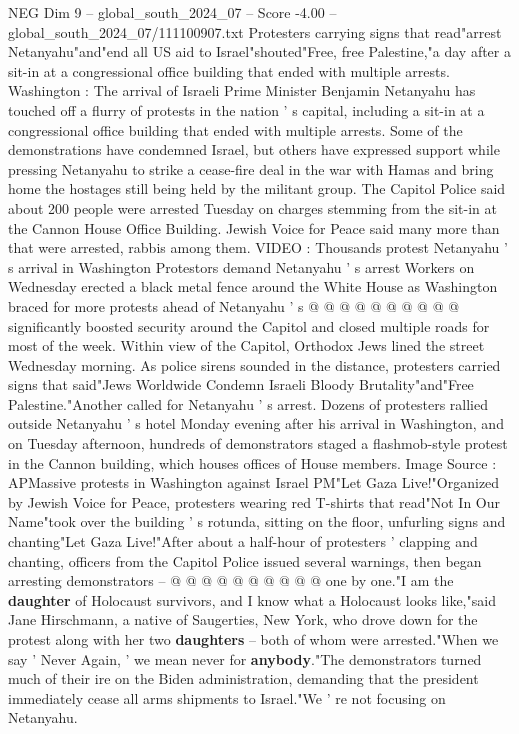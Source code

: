 \begin{textsample}{NEG Dim 9 – global\_south\_2024\_07 – Score -4.00 – global\_south\_2024\_07/111100907.txt}  \label{ex:f9_neg_340}
Protesters carrying signs that read"arrest Netanyahu"and"end all US aid to Israel"shouted"Free, free Palestine,"a day after a sit-in at a congressional office building that ended with multiple arrests.
Washington : The arrival of Israeli Prime Minister Benjamin Netanyahu has touched off a flurry of protests in the nation ' s capital, including a sit-in at a congressional office building that ended with multiple arrests.
Some of the demonstrations have condemned Israel, but others have expressed support while pressing Netanyahu to strike a cease-fire deal in the war with Hamas and bring home the hostages still being held by the militant group.
The Capitol Police said about 200 people were arrested Tuesday on charges stemming from the sit-in at the Cannon House Office Building.
Jewish Voice for Peace said many more than that were arrested, rabbis among them.
VIDEO : Thousands protest Netanyahu ' s arrival in Washington Protestors demand Netanyahu ' s arrest Workers on Wednesday erected a black metal fence around the White House as Washington braced for more protests ahead of Netanyahu ' s @ @ @ @ @ @ @ @ @ @ significantly boosted security around the Capitol and closed multiple roads for most of the week.
Within view of the Capitol, Orthodox Jews lined the street Wednesday morning.
As police sirens sounded in the distance, protesters carried signs that said"Jews Worldwide Condemn Israeli Bloody Brutality"and"Free Palestine."Another called for Netanyahu ' s arrest.
Dozens of protesters rallied outside Netanyahu ' s hotel Monday evening after his arrival in Washington, and on Tuesday afternoon, hundreds of demonstrators staged a flashmob-style protest in the Cannon building, which houses offices of House members.
Image Source : APMassive protests in Washington against Israel PM"Let Gaza Live!"Organized by Jewish Voice for Peace, protesters wearing red T-shirts that read"Not In Our Name"took over the building ' s rotunda, sitting on the floor, unfurling signs and chanting"Let Gaza Live!"After about a half-hour of protesters ' clapping and chanting, officers from the Capitol Police issued several warnings, then began arresting demonstrators -- @ @ @ @ @ @ @ @ @ @ one by one."I am the \textbf{daughter} of Holocaust survivors, and I know what a Holocaust looks like,"said Jane Hirschmann, a native of Saugerties, New York, who drove down for the protest along with her two \textbf{daughters} -- both of whom were arrested."When we say ' Never Again, ' we mean never for \textbf{anybody}."The demonstrators turned much of their ire on the Biden administration, demanding that the president immediately cease all arms shipments to Israel."We ' re not focusing on Netanyahu.

\end{textsample}
